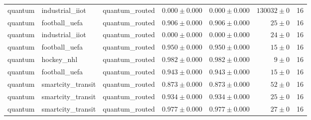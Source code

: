 \begin{table}[htbp]
\begin{tabular}{l l l r r r r}
quantum & industrial\_iiot & quantum\_routed & $0.000\pm0.000$ & $0.000\pm0.000$ & $130032\pm0$ & 16 \\
quantum & football\_uefa & quantum\_routed & $0.906\pm0.000$ & $0.906\pm0.000$ & $25\pm0$ & 16 \\
quantum & industrial\_iiot & quantum\_routed & $0.000\pm0.000$ & $0.000\pm0.000$ & $24\pm0$ & 16 \\
quantum & football\_uefa & quantum\_routed & $0.950\pm0.000$ & $0.950\pm0.000$ & $15\pm0$ & 16 \\
quantum & hockey\_nhl & quantum\_routed & $0.982\pm0.000$ & $0.982\pm0.000$ & $9\pm0$ & 16 \\
quantum & football\_uefa & quantum\_routed & $0.943\pm0.000$ & $0.943\pm0.000$ & $15\pm0$ & 16 \\
quantum & smartcity\_transit & quantum\_routed & $0.873\pm0.000$ & $0.873\pm0.000$ & $52\pm0$ & 16 \\
quantum & smartcity\_transit & quantum\_routed & $0.934\pm0.000$ & $0.934\pm0.000$ & $25\pm0$ & 16 \\
quantum & smartcity\_transit & quantum\_routed & $0.977\pm0.000$ & $0.977\pm0.000$ & $27\pm0$ & 16 \\
\hline
\end{tabular}
\end{table}
